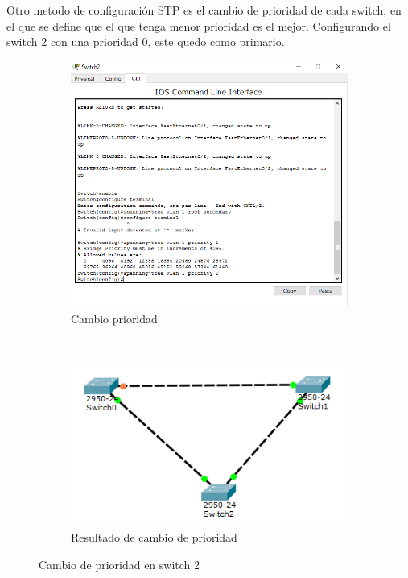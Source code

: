\documentclass[spanish]{udpreport}
\begin{document}
Otro metodo de configuración STP es el cambio de prioridad de cada switch, en el que se define que el que tenga menor prioridad es el mejor. Configurando el switch 2 con una prioridad 0, este quedo como primario.

\begin{figure}[htb]
    \centering
     \begin{subfigure}[b]{0.3\textwidth}
        \includegraphics[width=\textwidth]{photos/switch_2_prioridad_0.png}
        \caption{Cambio prioridad} \label{fig:photos/switch_2_prioridad_0.png}
    \end{subfigure}
    ~
    \begin{subfigure}[b]{0.3\textwidth}
        \includegraphics[width=\textwidth]{photos/resultado_cambio_prioridad.png}
        \caption{Resultado de cambio de prioridad} \label{fig:photos/resultado_cambio_prioridad.png}
    \end{subfigure}
    	\caption{Cambio de prioridad en switch 2}
\end{figure}
\end{document}

